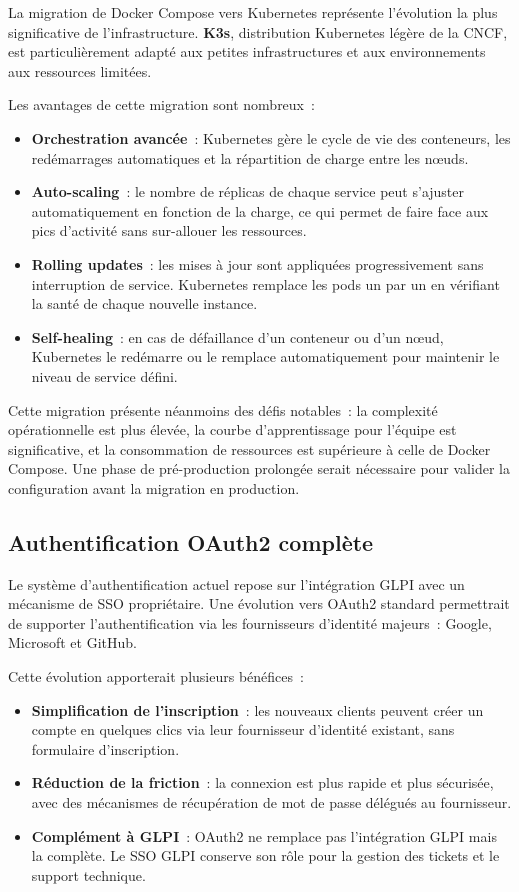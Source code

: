 La migration de Docker Compose vers Kubernetes représente l'évolution
la plus significative de l'infrastructure. \textbf{K3s}, distribution
Kubernetes légère de la CNCF, est particulièrement adapté aux petites
infrastructures et aux environnements aux ressources limitées.

Les avantages de cette migration sont nombreux~:

\begin{itemize}
  \item \textbf{Orchestration avancée}~: Kubernetes gère le cycle de vie
    des conteneurs, les redémarrages automatiques et la répartition de
    charge entre les nœuds.
  \item \textbf{Auto-scaling}~: le nombre de réplicas de chaque service
    peut s'ajuster automatiquement en fonction de la charge, ce qui
    permet de faire face aux pics d'activité sans sur-allouer les
    ressources.
  \item \textbf{Rolling updates}~: les mises à jour sont appliquées
    progressivement sans interruption de service. Kubernetes remplace
    les pods un par un en vérifiant la santé de chaque nouvelle
    instance.
  \item \textbf{Self-healing}~: en cas de défaillance d'un conteneur ou
    d'un nœud, Kubernetes le redémarre ou le remplace automatiquement
    pour maintenir le niveau de service défini.
\end{itemize}

Cette migration présente néanmoins des défis notables~: la complexité
opérationnelle est plus élevée, la courbe d'apprentissage pour l'équipe
est significative, et la consommation de ressources est supérieure à
celle de Docker Compose. Une phase de pré-production prolongée serait
nécessaire pour valider la configuration avant la migration en
production.

\subsection{Authentification OAuth2 complète}

Le système d'authentification actuel repose sur l'intégration GLPI avec
un mécanisme de SSO propriétaire. Une évolution vers OAuth2 standard
permettrait de supporter l'authentification via les fournisseurs
d'identité majeurs~: Google, Microsoft et GitHub.

Cette évolution apporterait plusieurs bénéfices~:

\begin{itemize}
  \item \textbf{Simplification de l'inscription}~: les nouveaux clients
    peuvent créer un compte en quelques clics via leur fournisseur
    d'identité existant, sans formulaire d'inscription.
  \item \textbf{Réduction de la friction}~: la connexion est plus rapide
    et plus sécurisée, avec des mécanismes de récupération de mot de
    passe délégués au fournisseur.
  \item \textbf{Complément à GLPI}~: OAuth2 ne remplace pas l'intégration
    GLPI mais la complète. Le SSO GLPI conserve son rôle pour la
    gestion des tickets et le support technique.
\end{itemize}

